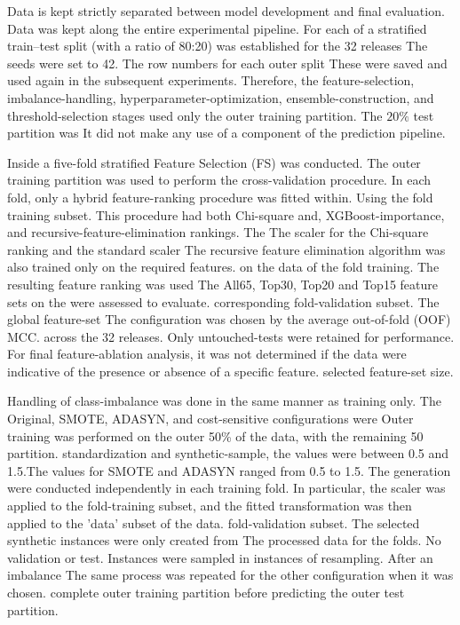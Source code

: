 \documentclass[conference]{IEEEtran}
\begin{document}
Data is kept strictly separated between model development and final evaluation.
Data was kept along the entire experimental pipeline. For each of
a stratified train--test split (with a ratio of 80:20) was established for the 32 releases
The seeds were set to 42. The row numbers for each outer split
These were saved and used again in the subsequent experiments. Therefore, the
feature-selection, imbalance-handling, hyperparameter-optimization,
ensemble-construction, and threshold-selection stages used only the
outer training partition. The \(20\%\) test partition was
It did not make any use of a component of the prediction pipeline.

Inside a five-fold stratified Feature Selection (FS) was conducted.
The outer training partition was used to perform the cross-validation procedure.
In each fold, only a hybrid feature-ranking procedure was fitted within.
Using the fold training subset. This procedure had both Chi-square and,
XGBoost-importance, and recursive-feature-elimination rankings. The
The scaler for the Chi-square ranking and the standard scaler
The recursive feature elimination algorithm was also trained only on the required features.
on the data of the fold training. The resulting feature ranking was used
The All65, Top30, Top20 and Top15 feature sets on the were assessed to evaluate.
corresponding fold-validation subset. The global feature-set
The configuration was chosen by the average out-of-fold (OOF) MCC.
across the 32 releases. Only untouched-tests were retained for performance.
For final feature-ablation analysis, it was not determined if the data were indicative of the presence or absence of a specific feature.
selected feature-set size.

Handling of class-imbalance was done in the same manner as training only.
The Original, SMOTE, ADASYN, and cost-sensitive configurations were
Outer training was performed on the outer 50\% of the data, with the remaining 50%
partition. standardization and synthetic-sample, the values were between 0.5 and 1.5.The values for SMOTE and ADASYN ranged from 0.5 to 1.5.
The generation were conducted independently in each training fold.
In particular, the scaler was applied to the fold-training subset, and
the fitted transformation was then applied to the 'data' subset of the data.
fold-validation subset. The selected synthetic instances were only created from
The processed data for the folds. No validation or test.
Instances were sampled in instances of resampling. After an imbalance
The same process was repeated for the other configuration when it was chosen.
complete outer training partition before predicting the outer test
partition.
\end{document}
